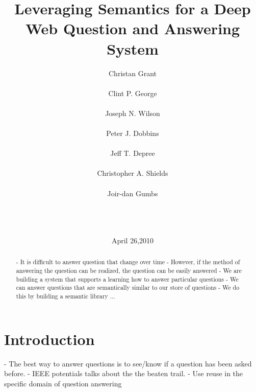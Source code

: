 \documentclass{www2010-submission}
\begin{document}
\title{Leveraging Semantics for a Deep Web Question and Answering System} 
\author{
	\alignauthor Christan Grant\\
	
	\alignauthor Clint P. George\\
	
	\alignauthor Joseph N. Wilson\\

	\alignauthor Peter J. Dobbins\\
	
	\alignauthor Jeff T. Depree\\

	\alignauthor Christopher A. Shields\\
	
	\alignauthor Joir-dan Gumbs\\
		
	\sharedaffiliation
	  \\
	 \\
}
\date{April 26,2010}

\maketitle

\begin{abstract}
- It is difficult to answer question that change over time
- However, if the method of answering the question can be realized, the question can be easily answered
- We are building a system that supports a learning how to answer particular questions
- We can answer questions that are semantically similar to our store of questions
- We do this by building a semantic library ...
\end{abstract}




\section{Introduction}
- The best way to answer questions is to see/know if a question has been asked before.
- IEEE potentials talks about the the beaten trail.
- Use reuse in the specific domain of question answering
\end{document}
